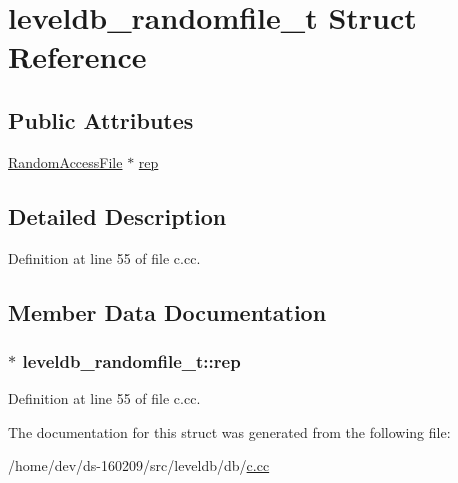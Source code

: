 \hypertarget{structleveldb__randomfile__t}{}\section{leveldb\+\_\+randomfile\+\_\+t Struct Reference}
\label{structleveldb__randomfile__t}
\subsection*{Public Attributes}
\begin{DoxyCompactItemize}
\item 
\hyperlink{classleveldb_1_1_random_access_file}{Random\+Access\+File} $\ast$ \hyperlink{structleveldb__randomfile__t_a66667ecc756a0ca312bbc94e2dfc27a5}{rep}
\end{DoxyCompactItemize}


\subsection{Detailed Description}


Definition at line 55 of file c.\+cc.



\subsection{Member Data Documentation}
\hypertarget{structleveldb__randomfile__t_a66667ecc756a0ca312bbc94e2dfc27a5}{}
\subsubsection[{rep}]{$\ast$ leveldb\+\_\+randomfile\+\_\+t\+::rep}\label{structleveldb__randomfile__t_a66667ecc756a0ca312bbc94e2dfc27a5}


Definition at line 55 of file c.\+cc.



The documentation for this struct was generated from the following file\+:\begin{DoxyCompactItemize}
\item 
/home/dev/ds-\/160209/src/leveldb/db/\hyperlink{c_8cc}{c.\+cc}\end{DoxyCompactItemize}
